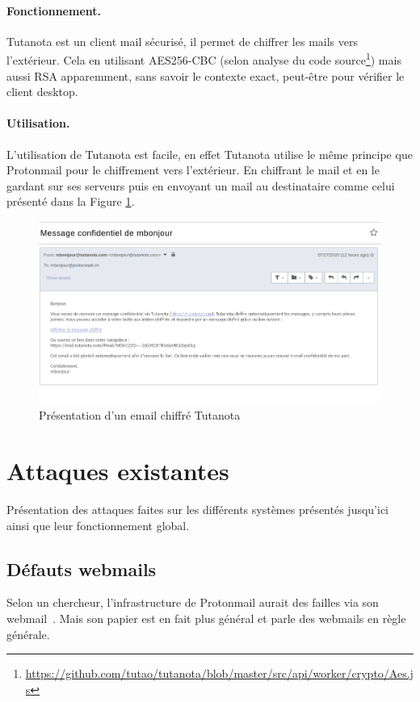 \paragraph*{Fonctionnement.}
Tutanota est un client mail sécurisé, il permet de chiffrer les mails vers l'extérieur. Cela en utilisant AES256-CBC (selon analyse du code source\footnote{\url{https://github.com/tutao/tutanota/blob/master/src/api/worker/crypto/Aes.js}}) mais aussi RSA apparemment, sans savoir le contexte exact, peut-être pour vérifier le client desktop.
\paragraph*{Utilisation.}
L'utilisation de Tutanota est facile, en effet Tutanota utilise le même principe que Protonmail pour le chiffrement vers l'extérieur. En chiffrant le mail et en le gardant sur ses serveurs puis en envoyant un mail au destinataire comme celui présenté dans la Figure \ref{fig:TutanotaPres}.

\begin{figure}[h!]
	\includegraphics[width=14cm]{images/tutanotaPresentation.png}
	\centering
	\caption{Présentation d'un email chiffré Tutanota}
	\label{fig:TutanotaPres}
\end{figure}

\section{Attaques existantes}
Présentation des attaques faites sur les différents systèmes présentés jusqu'ici ainsi que leur fonctionnement global.
\subsection{Défauts webmails}
Selon un chercheur, l'infrastructure de Protonmail aurait des failles via son webmail~\cite{DBLP:journals/iacr/Kobeissi18a}. Mais son papier est en fait plus général et parle des webmails en règle générale.

